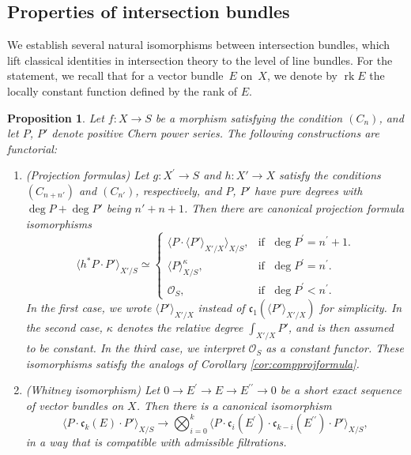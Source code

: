 \documentclass[JEP,XML,SOM,Unicode,published]{cedram}
\theoremstyle{plain}
\newtheorem{proposition}[theorem]{Proposition}
\theoremstyle{definition}
\newcommand{\Ocal}{\mathcal O}
\newcommand{\cfrak}{\mathfrak c}
\newcommand{\bis}{\prime\prime}
\DeclareMathOperator{\rk}{rk}
\begin{document}
\subsection{Properties of intersection bundles}\label{subsec:properties-of-intersection-bundles} We establish several natural isomorphisms between intersection bundles, which lift classical identities in intersection theory to the level of line bundles. For the statement, we recall that for a vector bundle~$E$ on~$X$, we denote by $\rk E$ the locally constant function defined by the rank of $E$.

\begin{proposition} \label{prop:properties-chern-bundles}
Let $f\colon X\to S$ be a morphism satisfying the condition $(C_{n})$, and let $P$, $P'$ denote positive Chern power series. The following constructions are functorial:
\begin{enumerate}

\item\label{item:projection-fromula} (Projection formulas) Let $g\colon X^{\prime}\to S$ and $h \colon X' \to X$ satisfy the conditions $(C_{n+n'})$ and $(C_{n'})$, respectively, and $P$, $P'$ have pure degrees with $\deg P + \deg P'$ being $n'+n+1$. Then there are canonical projection formula isomorphisms
\begin{displaymath}
\langle h^\ast P \cdot P' \rangle_{X'/S} \simeq
\begin{cases}
\langle P\cdot \langle P' \rangle_{X'/X} \rangle_{X/S}, & \text{if }\; \deg P^{\prime}=n^{\prime}+1.\\
\langle P \rangle_{X/S}^{\kappa}, & \text{if }\; \deg P^{\prime} = n^{\prime}. \\
\Ocal_S, & \text{if }\; \deg P^{\prime} < n^{\prime}.
\end{cases}
\end{displaymath}
In the first case, we wrote $\langle P' \rangle_{X'/X}$ instead of $\cfrak_{1}(\langle P' \rangle_{X'/X})$ for simplicity. In the second case, $\kappa$ denotes the relative degree $\int_{X'/X} P'$, and is then assumed to be constant. In the third case, we interpret $\Ocal_S$ as a constant functor. These isomorphisms satisfy the analogs of Corollary \ref{cor:compprojformula}.

\item \label{whitneyiso} (Whitney isomorphism) Let $0 \to E^{\prime}\to E \to E^{\bis} \to 0$ be a short exact sequence of vector bundles on $X$. Then there is a canonical isomorphism
\begin{displaymath}
\langle P \cdot \cfrak_{k}(E)\cdot P'\rangle_{X/S} \to \bigotimes_{i=0}^{k} \langle P \cdot \cfrak_{i}(E^{\prime}) \cdot \cfrak_{k-i}(E^{\bis})\cdot P' \rangle_{X/S},
\end{displaymath}
in a way that is compatible with admissible filtrations.


\end{enumerate}
\end{proposition}
\end{document}

